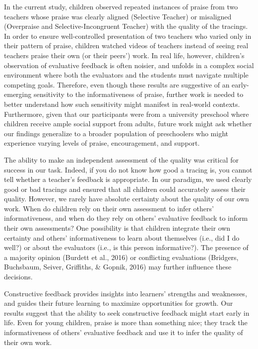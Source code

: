 \documentclass[10pt, letterpaper]{article}
\begin{document}
In the current study, children observed repeated instances of praise
from two teachers whose praise was clearly aligned (Selective Teacher)
or misaligned (Overpraise and Selective-Incongruent Teacher) with the
quality of the tracings. In order to ensure well-controlled presentation
of two teachers who varied only in their pattern of praise, children
watched videos of teachers instead of seeing real teachers praise their
own (or their peers') work. In real life, however, children's
observation of evaluative feedback is often noisier, and unfolds in a
complex social environment where both the evaluators and the students
must navigate multiple competing goals. Therefore, even though these
results are suggestive of an early-emerging sensitivity to the
informativeness of praise, further work is needed to better understand
how such sensitivity might manifest in real-world contexts. Furthermore,
given that our participants were from a university preschool where
children receive ample social support from adults, future work might ask
whether our findings generalize to a broader population of preschoolers
who might experience varying levels of praise, encouragement, and
support.

The ability to make an independent assessment of the quality was
critical for success in our task. Indeed, if you do not know how good a
tracing is, you cannot tell whether a teacher's feedback is appropriate.
In our paradigm, we used clearly good or bad tracings and ensured that
all children could accurately assess their quality. However, we rarely
have absolute certainty about the quality of our own work. When do
children rely on their own assessment to infer others' informativeness,
and when do they rely on others' evaluative feedback to inform their own
assessments? One possibility is that children integrate their own
certainty and others' informativeness to learn about themselves (i.e.,
did I do well?) or about the evaluators (i.e., is this person
informative?). The presence of a majority opinion (Burdett et al., 2016)
or conflicting evaluations (Bridgers, Buchsbaum, Seiver, Griffiths, \&
Gopnik, 2016) may further influence these decisions.

Constructive feedback provides insights into learners' strengths and
weaknesses, and guides their future learning to maximize opportunities
for growth. Our results suggest that the ability to seek constructive
feedback might start early in life. Even for young children, praise is
more than something nice; they track the informativeness of others'
evaluative feedback and use it to infer the quality of their own work.
\end{document}
